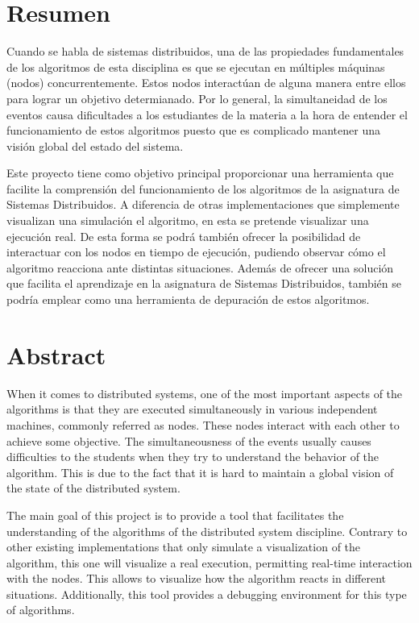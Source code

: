 \chapter*{Resumen}

Cuando se habla de sistemas distribuidos, una de las propiedades fundamentales de los algoritmos de esta disciplina es que se ejecutan en múltiples máquinas (nodos) concurrentemente. Estos nodos interactúan de alguna manera entre ellos para lograr un objetivo determianado. Por lo general, la simultaneidad de los eventos causa dificultades a los estudiantes de la materia a la hora de entender el funcionamiento de estos algoritmos puesto que es complicado mantener una visión global del estado del sistema.

Este proyecto tiene como objetivo principal proporcionar una herramienta que facilite la comprensión del funcionamiento de los algoritmos de la asignatura de Sistemas Distribuidos. A diferencia de otras implementaciones que simplemente visualizan una simulación el algoritmo, en esta se pretende visualizar una ejecución real. De esta forma se podrá también ofrecer la posibilidad de interactuar con los nodos en tiempo de ejecución, pudiendo observar cómo el algoritmo reacciona ante distintas situaciones. Además de ofrecer una solución que facilita el aprendizaje en la asignatura de Sistemas Distribuidos, también se podría emplear como una herramienta de depuración de estos algoritmos.

\newpage

\chapter*{Abstract}

When it comes to distributed systems, one of the most important aspects of the algorithms is that they are executed simultaneously in various independent machines, commonly referred as nodes. These nodes interact with each other to achieve some objective. The simultaneousness of the events usually causes difficulties to the students when they try to understand the behavior of the algorithm. This is due to the fact that it is hard to maintain a global vision of the state of the distributed system.

The main goal of this project is to provide a tool that facilitates the understanding of the algorithms of the distributed system discipline. Contrary to other existing implementations that only simulate a visualization of the algorithm, this one will visualize a real execution, permitting real-time interaction with the nodes. This allows to visualize how the algorithm reacts in different situations. Additionally, this tool provides a debugging environment for this type of algorithms.


